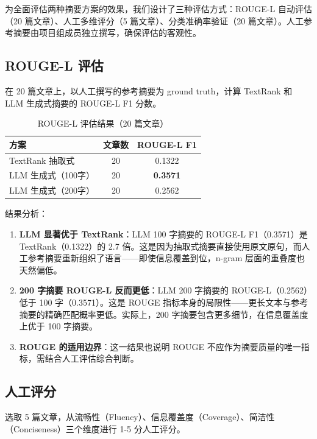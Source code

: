\documentclass[12pt,a4paper]{ctexart}
\begin{document}
为全面评估两种摘要方案的效果，我们设计了三种评估方式：ROUGE-L 自动评估（20 篇文章）、人工多维评分（5 篇文章）、分类准确率验证（20 篇文章）。人工参考摘要由项目组成员独立撰写，确保评估的客观性。

\subsection{ROUGE-L 评估}

在 20 篇文章上，以人工撰写的参考摘要为 ground truth，计算 TextRank 和 LLM 生成式摘要的 ROUGE-L F1 分数。

\begin{table}[H]
\centering
\caption{ROUGE-L 评估结果（20 篇文章）}
\label{tab:rouge}
\begin{tabular}{lcc}
\toprule
\textbf{方案} & \textbf{文章数} & \textbf{ROUGE-L F1} \\
\midrule
TextRank 抽取式   & 20 & 0.1322 \\
LLM 生成式（100字） & 20 & \textbf{0.3571} \\
LLM 生成式（200字） & 20 & 0.2562 \\
\bottomrule
\end{tabular}
\end{table}

结果分析：

\begin{enumerate}[label=(\arabic*),nosep]
    \item \textbf{LLM 显著优于 TextRank}：LLM 100 字摘要的 ROUGE-L F1（0.3571）是 TextRank（0.1322）的 2.7 倍。这是因为抽取式摘要直接使用原文原句，而人工参考摘要重新组织了语言——即使信息覆盖到位，n-gram 层面的重叠度也天然偏低。
    \item \textbf{200 字摘要 ROUGE-L 反而更低}：LLM 200 字摘要的 ROUGE-L（0.2562）低于 100 字（0.3571）。这是 ROUGE 指标本身的局限性——更长文本与参考摘要的精确匹配概率更低。实际上，200 字摘要包含更多细节，在信息覆盖度上优于 100 字摘要。
    \item \textbf{ROUGE 的适用边界}：这一结果也说明 ROUGE 不应作为摘要质量的唯一指标，需结合人工评估综合判断。
\end{enumerate}

\subsection{人工评分}

选取 5 篇文章，从流畅性（Fluency）、信息覆盖度（Coverage）、简洁性（Conciseness）三个维度进行 1-5 分人工评分。
\end{document}
